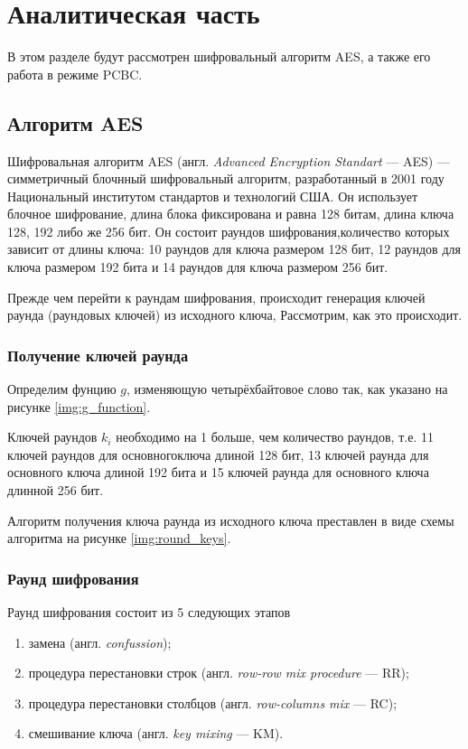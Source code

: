 \chapter{Аналитическая часть}
В этом разделе будут рассмотрен шифровальный алгоритм AES, а также его работа в режиме PCBC.


\section{Алгоритм AES}

Шифровальная алгоритм AES (англ. \textit{Advanced Encryption Standart} --- AES) --- симметричный блочнный шифровальный алгоритм, разработанный в 2001 году Национальный институтом стандартов и технологий США. Он использует блочное шифрование, длина блока фиксирована и равна 128 битам, длина ключа 128, 192 либо же 256 бит. Он состоит раундов шифрования,количество которых зависит от длины ключа: 10 раундов для ключа размером 128 бит, 12 раундов для ключа размером 192 бита и 14 раундов для ключа размером 256 бит.

Прежде чем перейти к раундам шифрования, происходит генерация ключей раунда (раундовых ключей) из исходного ключа, Рассмотрим, как это происходит.

\subsection{Получение ключей раунда}

Определим фунцию $g$, изменяющую четырёхбайтовое слово так, как указано на рисунке \ref{img:g_function}.



Ключей раундов $k_{i}$ необходимо на 1 больше, чем количество раундов, т.е. 11 ключей раундов для основногоключа длиной 128 бит, 13 ключей раунда для основного ключа длиной 192 бита и 15 ключей раунда для основного ключа длинной 256 бит.

Алгоритм получения ключа раунда из исходного ключа преставлен в виде схемы алгоритма на рисунке \ref{img:round_keys}.


\clearpage
\subsection{Раунд шифрования}

Раунд шифрования состоит из 5 следующих этапов
\begin{enumerate}[label=\arabic*)]
	\item замена (англ. \textit{confussion});
    \item процедура перестановки строк (англ. \textit{row-row mix procedure} --- RR);
	\item процедура перестановки столбцов (англ. \textit{row-columns mix} --- RC);
	\item смешивание ключа (англ. \textit{key mixing} --- KM).
\end{enumerate}

